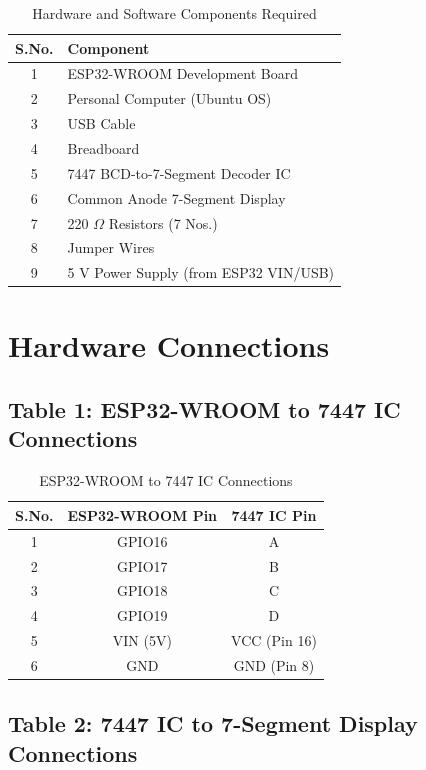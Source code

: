 \documentclass[12pt,a4paper]{article}
\begin{document}
\begin{table}[h]
\centering
\begin{tabular}{|c|l|}
\hline
\textbf{S.No.} & \textbf{Component} \\ \hline
1 & ESP32-WROOM Development Board \\ \hline
2 & Personal Computer (Ubuntu OS) \\ \hline
3 & USB Cable \\ \hline
4 & Breadboard \\ \hline
5 & 7447 BCD-to-7-Segment Decoder IC \\ \hline
6 & Common Anode 7-Segment Display \\ \hline
7 & 220 $\Omega$ Resistors (7 Nos.) \\ \hline
8 & Jumper Wires \\ \hline
9 & 5 V Power Supply (from ESP32 VIN/USB) \\ \hline

\end{tabular}
\caption{Hardware and Software Components Required}
\label{tab:hardware_components}
\end{table}
\section*{Hardware Connections}

\subsection*{Table 1: ESP32-WROOM to 7447 IC Connections}

\begin{table}[h]
\centering
\begin{tabular}{|c|c|c|}
\hline
\textbf{S.No.} & \textbf{ESP32-WROOM Pin} & \textbf{7447 IC Pin} \\ \hline
1 & GPIO16 & A \\ \hline
2 & GPIO17 & B \\ \hline
3 & GPIO18 & C \\ \hline
4 & GPIO19 & D \\ \hline
5 & VIN (5V) & VCC (Pin 16) \\ \hline
6 & GND & GND (Pin 8) \\ \hline
\end{tabular}
\caption{ESP32-WROOM to 7447 IC Connections}
\label{tab:esp7447}
\end{table}


\subsection*{Table 2: 7447 IC to 7-Segment Display Connections}
\end{document}
